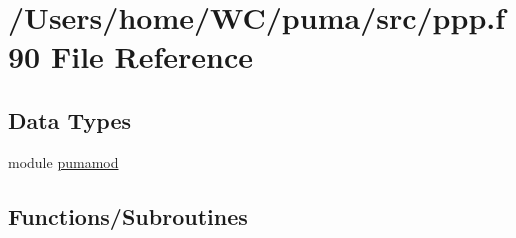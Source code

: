 \hypertarget{ppp_8f90}{
\section{/\-Users/home/\-W\-C/puma/src/ppp.f90 \-File \-Reference}
\label{ppp_8f90}
}
\subsection*{\-Data \-Types}
\begin{DoxyCompactItemize}
\item 
module \hyperlink{classpumamod}{pumamod}
\end{DoxyCompactItemize}
\subsection*{\-Functions/\-Subroutines}
